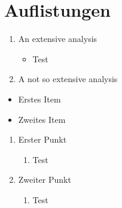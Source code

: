 \documentclass[10pt, a4paper]{article}
\begin{document}
\section{Auflistungen}
\blindtext
\begin{enumerate}
  \item  An extensive analysis 
   \begin{itemize}
     \item Test
   \end{itemize}
 \item A not so extensive analysis
\end{enumerate}

\blindtext

\begin{itemize}
  \item Erstes Item
  \item[\ding{43}] Zweites Item
\end{itemize}


\begin{enumerate}
  \item Erster Punkt
  \begin{enumerate}
    \item Test
  \end{enumerate}
  \item Zweiter Punkt
  \begin{enumerate}
    \item Test
  \end{enumerate}
\end{enumerate}
\end{document}

